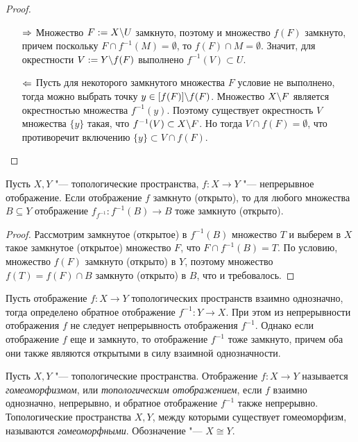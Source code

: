 \begin{proof}~
	\begin{itemize}
		\item[$\Rightarrow$] Множество $F := X \backslash U$ замкнуто, поэтому и множество $f(F)$ замкнуто, причем поскольку $F \cap f^{-1}(M) = \emptyset$, то $f(F) \cap M = \emptyset$. Значит, для окрестности $V := Y \backslash f(F)$ выполнено $f^{-1}(V) \subset U$.
		
		\item[$\Leftarrow$] Пусть для некоторого замкнутого множества $F$ условие не выполнено, тогда можно выбрать точку $y \in [f(F)] \backslash f(F)$. Множество $X \backslash F$ является окрестностью множества $f^{-1}(y)$. Поэтому существует окрестность $V$ множества $\{y\}$ такая, что $f^{-1}(V) \subset X \backslash F$. Но тогда $V \cap f(F) = \emptyset$, что противоречит включению $\{y\} \subset V \cap f(F)$.\qedhere
	\end{itemize}
\end{proof}

\begin{proposition}
	Пусть $X, Y$ "--- топологические пространства, $f: X \to Y$ "--- непрерывное отображение. Если отображение $f$ замкнуто (открыто), то для любого множества $B \subseteq Y$ отображение $f_{f^{-1}}: f^{-1}(B) \rightarrow B$ тоже замкнуто (открыто).
\end{proposition}

\begin{proof}
	Рассмотрим замкнутое (открытое) в $f^{-1}(B)$ множество $T$ и выберем в $X$ такое замкнутое (открытое) множество $F$, что $F \cap f^{-1}(B) = T$. По условию, множество $f(F)$ замкнуто (открыто) в $Y$, поэтому множество $f(T) = f(F) \cap B$ замкнуто (открыто) в $B$, что и требовалось.
\end{proof}

\begin{note}
	Пусть отображение $f: X \rightarrow Y$ топологических пространств взаимно однозначно, тогда определено обратное отображение $f^{-1}: Y \to X$. При этом из непрерывности отображения $f$ не следует непрерывность отображения $f^{-1}$. Однако если отображение $f$ еще и замкнуто, то отображение $f^{-1}$ тоже замкнуто, причем оба они также являются открытыми в силу взаимной однозначности.
\end{note}

\begin{definition}
	Пусть $X, Y$ "--- топологические пространства. Отображение $f: X \rightarrow Y$ называется \textit{гомеоморфизмом}, или \textit{топологическим отображением}, если $f$ взаимно однозначно, непрерывно, и обратное отображение $f^{-1}$ также непрерывно. Топологические пространства $X, Y$, между которыми существует гомеоморфизм, называются \textit{гомеоморфными}. Обозначение "--- $X \cong Y$.
\end{definition}

